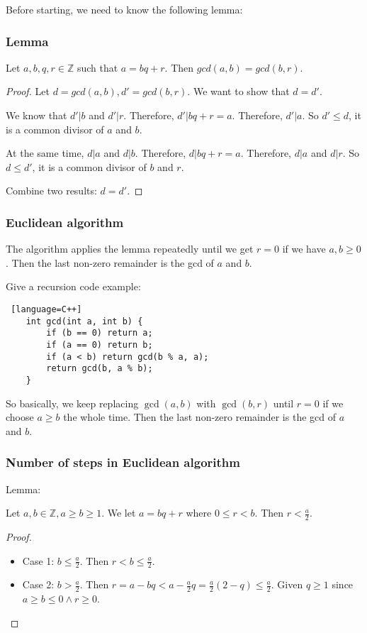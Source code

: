 \documentclass[letterpaper,12pt,oneside]{article}
\begin{document}
Before starting, we need to know the following lemma:

\subsubsection{Lemma}
Let $a, b, q, r \in \mathbb{Z}$ such that $a = bq + r$. Then $gcd(a, b) =
    gcd(b, r)$.\begin{proof}
    Let $d = gcd(a, b), d' = gcd(b, r)$. We want to show that $d = d'$.

    We know that $d' | b$ and $d' | r$. Therefore, $d' | bq + r = a$. Therefore,
    $d' | a$. So $d' \leq d$, it is a common divisor of $a$ and $b$.

    At the same time, $d | a$ and $d | b$. Therefore, $d | bq + r = a$. Therefore,
    $d | a$ and $d | r$. So $d \leq d'$, it is a common divisor of $b$ and $r$.

    Combine two results: $d = d'$.
\end{proof}
\subsubsection{Euclidean algorithm}
The algorithm applies the lemma repeatedly until we get $r = 0$ if we have
$a,b\ge 0$. Then the last non-zero remainder is the gcd of $a$ and $b$.

Give a recursion code example:\begin{lstlisting} [language=C++]
    int gcd(int a, int b) {
        if (b == 0) return a;
        if (a == 0) return b;
        if (a < b) return gcd(b % a, a);
        return gcd(b, a % b);
    }
\end{lstlisting}
So basically, we keep replacing $\gcd(a, b)$ with $\gcd(b, r)$ until $r = 0$ if
we choose $a\ge b$ the whole time. Then the last non-zero remainder is the gcd
of $a$ and $b$.

\subsubsection{Number of steps in Euclidean algorithm}
Lemma:

Let $a, b \in \mathbb{Z}, a \ge b \ge 1$. We let $a = bq + r$ where $0 \leq r <
    b$. Then $r < \frac{a}{2}$. \begin{proof}
    \begin{itemize}
        \item Case 1: $b \leq \frac{a}{2}$. Then $r < b \leq \frac{a}{2}$.
        \item Case 2: $b > \frac{a}{2}$. Then $r = a - bq < a - \frac{a}{2}q =
                  \frac{a}{2}(2-q) \leq \frac{a}{2}$. Given $q \ge 1$ since $a \ge b \le 0 \land
                  r \ge 0$.
    \end{itemize}
\end{proof}
\end{document}

